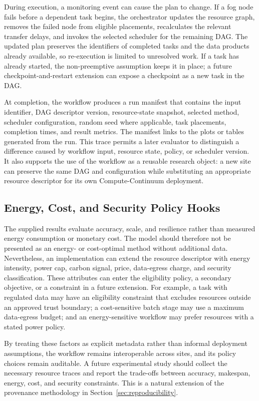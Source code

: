 During execution, a monitoring event can cause the plan to change. If a fog node fails before a dependent task begins, the orchestrator updates the resource graph, removes the failed node from eligible placements, recalculates the relevant transfer delays, and invokes the selected scheduler for the remaining DAG. The updated plan preserves the identifiers of completed tasks and the data products already available, so re-execution is limited to unresolved work. If a task has already started, the non-preemptive assumption keeps it in place; a future checkpoint-and-restart extension can expose a checkpoint as a new task in the DAG.

At completion, the workflow produces a run manifest that contains the input identifier, DAG descriptor version, resource-state snapshot, selected method, scheduler configuration, random seed where applicable, task placements, completion times, and result metrics. The manifest links to the plots or tables generated from the run. This trace permits a later evaluator to distinguish a difference caused by workflow input, resource state, policy, or scheduler version. It also supports the use of the workflow as a reusable research object: a new site can preserve the same DAG and configuration while substituting an appropriate resource descriptor for its own Compute-Continuum deployment.

\subsection{Energy, Cost, and Security Policy Hooks}

The supplied results evaluate accuracy, scale, and resilience rather than measured energy consumption or monetary cost. The model should therefore not be presented as an energy- or cost-optimal method without additional data. Nevertheless, an implementation can extend the resource descriptor with energy intensity, power cap, carbon signal, price, data-egress charge, and security classification. These attributes can enter the eligibility policy, a secondary objective, or a constraint in a future extension. For example, a task with regulated data may have an eligibility constraint that excludes resources outside an approved trust boundary; a cost-sensitive batch stage may use a maximum data-egress budget; and an energy-sensitive workflow may prefer resources with a stated power policy.

By treating these factors as explicit metadata rather than informal deployment assumptions, the workflow remains interoperable across sites, and its policy choices remain auditable. A future experimental study should collect the necessary resource traces and report the trade-offs between accuracy, makespan, energy, cost, and security constraints. This is a natural extension of the provenance methodology in Section~\ref{sec:reproducibility}.
